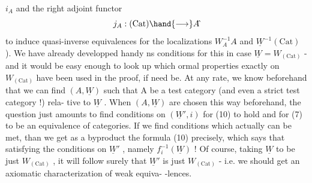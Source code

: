 
$i_A$ and the  right adjoint functor
\[ j_A : (\mathrm{Cat}) \hand{\longrightarrow} A\hat{} \]
to induce quasi-inverse  equivalences for the localizations
$W_A^{-1}A\hat{}$ and $\underline{W}^{-1}(\mathrm{Cat})$ ). We have already developped handy ns conditions
for this in case $\underline{W} = W_{(\mathrm{Cat})}$ - and it would be easy enough to look up
which ormal properties exactly on $W_{(\mathrm{Cat})}$ have been used in the proof,
if need be. At any rate, we know beforehand that we can find $(A,\underline{W})$
such that A be a  test category (and even a strict test category !) rela-%
tive to $\underline{W}$ . When $(A,\underline{W})$ are chosen this way beforehand, the question
just amounts to find conditions  on $(\underline{W}',i)$ for (10) to hold
and for (7) to be an equivalence of categories. If we find conditions
which actually can be met, than we get as a by\hand{-}product the formula (10)
precisely, which says that   satisfying the conditions on
$\underline{W}'$ , namely $f_i^{-1}(\underline{W})$ ! Of course, taking $\underline{W}$ 
 to be just $W_{(\mathrm{Cat})}$ , it will follow surely that $\underline{W}'$ is just
$W_{(\mathrm{Cat})}$ - i.e. we should get an axiomatic characterization of weak equiva-%
-lences.


